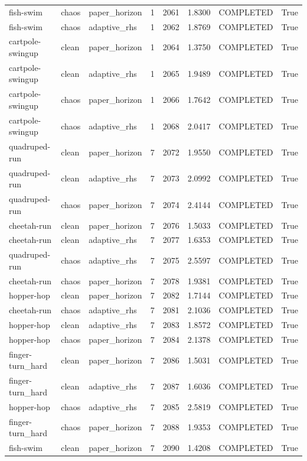 \begin{tabular}{llllllll}
fish-swim & chaos & paper\_horizon & 1 & 2061 & 1.8300 & COMPLETED & True \\
fish-swim & chaos & adaptive\_rhs & 1 & 2062 & 1.8769 & COMPLETED & True \\
cartpole-swingup & clean & paper\_horizon & 1 & 2064 & 1.3750 & COMPLETED & True \\
cartpole-swingup & clean & adaptive\_rhs & 1 & 2065 & 1.9489 & COMPLETED & True \\
cartpole-swingup & chaos & paper\_horizon & 1 & 2066 & 1.7642 & COMPLETED & True \\
cartpole-swingup & chaos & adaptive\_rhs & 1 & 2068 & 2.0417 & COMPLETED & True \\
quadruped-run & clean & paper\_horizon & 7 & 2072 & 1.9550 & COMPLETED & True \\
quadruped-run & clean & adaptive\_rhs & 7 & 2073 & 2.0992 & COMPLETED & True \\
quadruped-run & chaos & paper\_horizon & 7 & 2074 & 2.4144 & COMPLETED & True \\
cheetah-run & clean & paper\_horizon & 7 & 2076 & 1.5033 & COMPLETED & True \\
cheetah-run & clean & adaptive\_rhs & 7 & 2077 & 1.6353 & COMPLETED & True \\
quadruped-run & chaos & adaptive\_rhs & 7 & 2075 & 2.5597 & COMPLETED & True \\
cheetah-run & chaos & paper\_horizon & 7 & 2078 & 1.9381 & COMPLETED & True \\
hopper-hop & clean & paper\_horizon & 7 & 2082 & 1.7144 & COMPLETED & True \\
cheetah-run & chaos & adaptive\_rhs & 7 & 2081 & 2.1036 & COMPLETED & True \\
hopper-hop & clean & adaptive\_rhs & 7 & 2083 & 1.8572 & COMPLETED & True \\
hopper-hop & chaos & paper\_horizon & 7 & 2084 & 2.1378 & COMPLETED & True \\
finger-turn\_hard & clean & paper\_horizon & 7 & 2086 & 1.5031 & COMPLETED & True \\
finger-turn\_hard & clean & adaptive\_rhs & 7 & 2087 & 1.6036 & COMPLETED & True \\
hopper-hop & chaos & adaptive\_rhs & 7 & 2085 & 2.5819 & COMPLETED & True \\
finger-turn\_hard & chaos & paper\_horizon & 7 & 2088 & 1.9353 & COMPLETED & True \\
fish-swim & clean & paper\_horizon & 7 & 2090 & 1.4208 & COMPLETED & True \\

\end{tabular}
